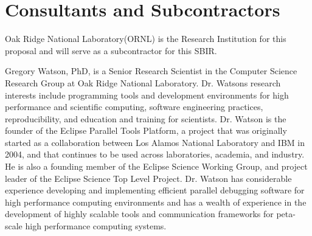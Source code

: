 \section{Consultants and Subcontractors}
Oak Ridge National Laboratory(ORNL) is the Research Institution for this proposal and will serve as a subcontractor for this SBIR. 

Gregory Watson, PhD, is a Senior Research Scientist in the Computer Science Research Group at Oak Ridge National Laboratory. Dr. Watsons research interests include programming tools and development environments for high performance and scientific computing, software engineering practices, reproducibility, and education and training for scientists. Dr. Watson is the founder of the Eclipse Parallel Tools Platform, a project that was originally started as a collaboration between Los Alamos National Laboratory and IBM in 2004, and that continues to be used across laboratories, academia, and industry. He is also a founding member of the Eclipse Science Working Group, and project leader of the Eclipse Science Top Level Project. Dr. Watson has considerable experience developing and implementing efficient parallel debugging software for high performance computing environments and has a wealth of experience in the development of highly scalable tools and communication frameworks for peta-scale high performance computing systems.
